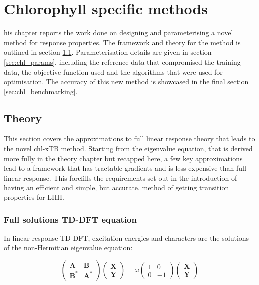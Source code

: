 %
%
\let\textcircled=\pgftextcircled
\chapter{Chlorophyll specific methods}
\label{chap:chl_xtb}

his chapter reports the work done on designing and parameterising a
novel method for response properties. The framework and theory for the method is
outlined in section \ref{sec:theory}. Parameterisation details are given in 
section \ref{sec:chl_params}, including the reference data that compromised the 
training data, the objective function used and the algorithms that were used for
optimisation. The accuracy of this new method is showcased in the final section 
\ref{sec:chl_benchmarking}.

\section{Theory}
\label{sec:theory}

This section covers the approximations to full linear response theory that leads to the 
novel chl-xTB method. Starting from the eigenvalue equation, that is derived more
fully in the theory chapter but recapped here, a few key approximations lead to 
a framework that has tractable gradients and is less expensive than full linear
response. This forefills the requirements set out in the introduction of having
an efficient and simple, but accurate, method of getting transition properties
for LHII.

\subsection{Full solutions TD-DFT equation}
In linear-response TD-DFT, excitation energies and characters are the solutions
of the non-Hermitian eigenvalue equation:

\begin{equation}
    \begin{pmatrix}
        \mathbf{A}   & \mathbf{B} \\
        \mathbf{B}^\ast  & \mathbf{A}^\ast
    \end{pmatrix}
    \begin{pmatrix}
        \mathbf{X} \\
        \mathbf{Y}
    \end{pmatrix}
    = 
    \omega
    \begin{pmatrix}
        1 & 0 \\
        0 & -1
    \end{pmatrix}
    \begin{pmatrix}
        \mathbf{X} \\
        \mathbf{Y}
    \end{pmatrix}
\end{equation}

